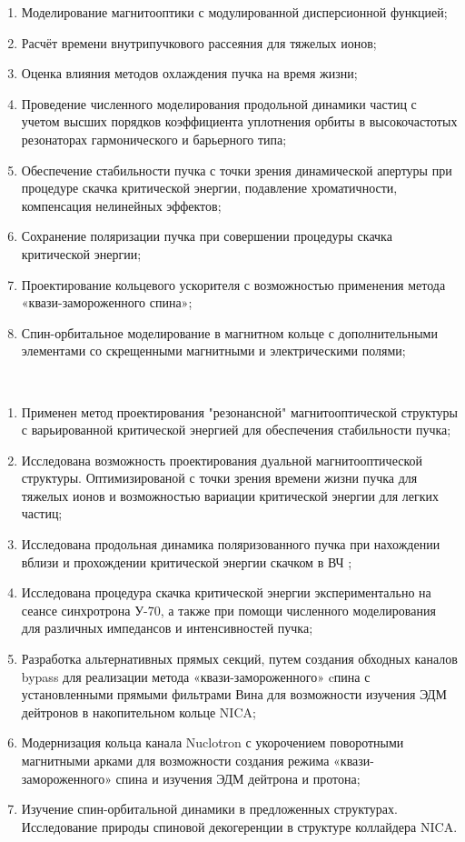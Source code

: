 \begin{enumerate}[beginpenalty=10000] %
  \item Моделирование магнитооптики с модулированной дисперсионной функцией;
  \item Расчёт времени внутрипучкового рассеяния для тяжелых ионов;
  \item Оценка влияния методов охлаждения пучка на время жизни;
  \item Проведение численного моделирования продольной динамики частиц с учетом высших порядков коэффициента уплотнения орбиты в высокочастотых резонаторах гармонического и барьерного типа;
  \item Обеспечение стабильности пучка с точки зрения динамической апертуры при процедуре скачка критической энергии, подавление хроматичности, компенсация нелинейных эффектов;
  \item Сохранение поляризации пучка при совершении процедуры скачка критической энергии;
  \item Проектирование кольцевого ускорителя с возможностью применения метода «квази-замороженного спина»;
  \item Спин-орбитальное моделирование в магнитном кольце с дополнительными элементами со скрещенными магнитными и электрическими полями;
\end{enumerate}
~\\
\par {\novelty}
\begin{enumerate}[beginpenalty=10000] %
  \item 	Применен метод проектирования "резонансной" магнитооптической структуры с варьированной критической энергией для обеспечения стабильности пучка;
   \item	Исследована возможность проектирования дуальной магнитооптической структуры. Оптимизированой с точки зрения времени жизни пучка для тяжелых ионов и возможностью вариации критической энергии для легких частиц;
  \item	Исследована продольная динамика поляризованного пучка при нахождении вблизи и прохождении критической энергии скачком в ВЧ ;
   \item	Исследована процедура скачка критической энергии экспериментально на сеансе синхротрона У-70, а также при помощи численного моделирования для различных импедансов и интенсивностей пучка;
  \item	Разработка альтернативных прямых секций, путем создания обходных каналов bypass для реализации метода «квази-замороженного» cпина с установленными прямыми фильтрами Вина для возможности изучения ЭДМ дейтронов в накопительном кольце NICA;
  \item	Модернизация кольца канала Nuclotron с укорочением поворотными магнитными арками для возможности создания режима «квази-замороженного» спина и изучения ЭДМ дейтрона и протона;
  \item	Изучение спин-орбитальной динамики в предложенных структурах. Исследование природы спиновой декогеренции в структуре коллайдера NICA.
\end{enumerate}
